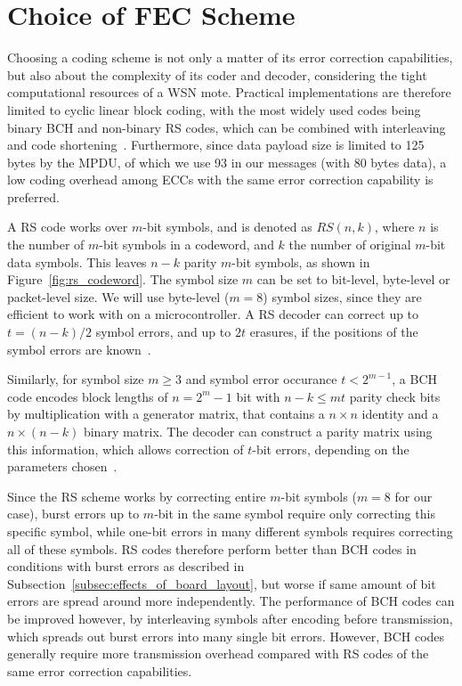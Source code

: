 \section{Choice of \acs{FEC} Scheme}

Choosing a coding scheme is not only a matter of its error correction capabilities, but also about the complexity of its coder and decoder, considering the tight computational resources of a \ac{WSN} mote.
Practical implementations are therefore limited to cyclic linear block coding, with the most widely used codes being binary \ac{BCH} and non-binary \ac{RS} codes, which can be combined with interleaving and code shortening~\cite{Liu1997}.
Furthermore, since data payload size is limited to 125 bytes by the \ac{MPDU}, of which we use 93 in our messages (with 80 bytes data), a low coding overhead among \ac{ECC}s with the same error correction capability is preferred.

A \ac{RS} code works over $m$-bit symbols, and is denoted as $RS(n, k)$, where $n$ is the number of $m$-bit symbols in a codeword, and $k$ the number of original $m$-bit data symbols.
This leaves $n-k$ parity $m$-bit symbols, as shown in Figure~\ref{fig:rs_codeword}.
The symbol size $m$ can be set to bit-level, byte-level or packet-level size. We will use byte-level ($m=8$) symbol sizes, since they are efficient to work with on a microcontroller.
A \ac{RS} decoder can correct up to $t=(n-k)/2$ symbol errors, and up to $2t$ erasures, if the positions of the symbol errors are known~\cite{Liu1997}.

Similarly, for symbol size $m \ge 3$ and symbol error occurance $t < 2^{m-1}$, a \ac{BCH} code encodes block lengths of $n = 2^m - 1$ bit with $n-k \le mt$ parity check bits by multiplication with a generator matrix, that contains a $n \times n$ identity and a $n \times (n-k)$ binary matrix.
The decoder can construct a parity matrix using this information, which allows correction of $t$-bit errors, depending on the parameters chosen~\cite{Liu1997}.

Since the \ac{RS} scheme works by correcting entire $m$-bit symbols ($m=8$ for our case), burst errors up to $m$-bit in the same symbol require only correcting this specific symbol, while one-bit errors in many different symbols requires correcting all of these symbols.
\ac{RS} codes therefore perform better than \ac{BCH} codes in conditions with burst errors as described in Subsection~\ref{subsec:effects_of_board_layout}, but worse if same amount of bit errors are spread around more independently.
The performance of \ac{BCH} codes can be improved however, by interleaving symbols after encoding before transmission, which spreads out burst errors into many single bit errors.
However, \ac{BCH} codes generally require more transmission overhead compared with \ac{RS} codes of the same error correction capabilities.

